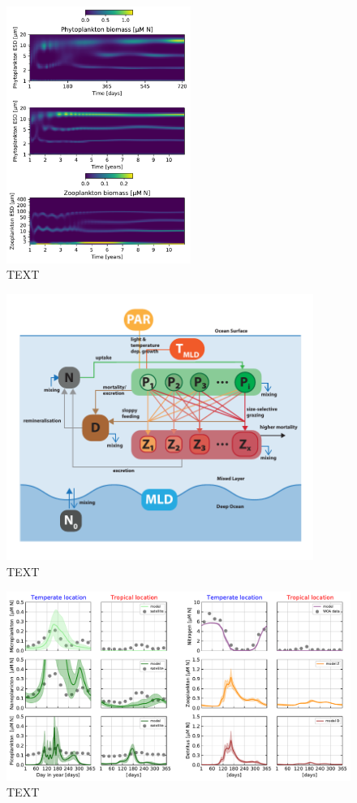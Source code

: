 \documentclass[journal abbreviation, manuscript]{copernicus}
\begin{document}
\begin{figure}[t]
\includegraphics[width=6cm]{Figures/firstdraft_plots/03_chemostat.pdf}
\caption{TEXT}
\label{ASTroCAT_plot}
\end{figure}

\begin{figure}[t]
\includegraphics[width=10cm]{Figures/firstdraft_schematics/03__schematics_SizeStructSlab.pdf}
\caption{TEXT}
\label{phydraschematics_3}
\end{figure}



\begin{figure}[t]
\includegraphics[width=12cm]{Figures/firstdraft_plots/04_sizestruct_slab.pdf}
\caption{TEXT}
\label{ASTroCAT_plot}
\end{figure}
\end{document}
